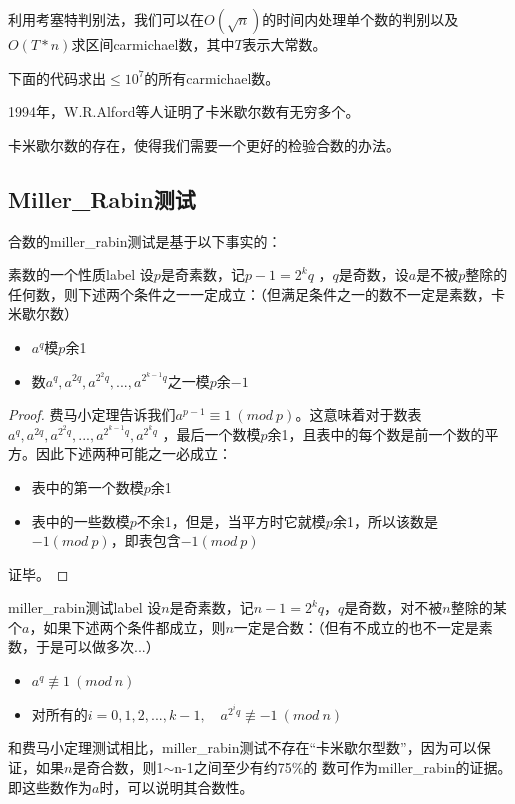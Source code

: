 利用考塞特判别法，我们可以在$O(\sqrt{n})$的时间内处理单个数的判别以及$O(T*n)$求区间carmichael数，其中$T$表示大常数。

下面的代码求出$\le 10^7$的所有carmichael数。


1994年，W.R.Alford等人证明了卡米歇尔数有无穷多个。

卡米歇尔数的存在，使得我们需要一个更好的检验合数的办法。

\subsection{Miller\_Rabin测试}
合数的miller\_rabin测试是基于以下事实的：

\begin{theorem}{素数的一个性质}{label}
设$p$是奇素数，记$p-1=2^kq$ ，$q$是奇数，{\heiti 设$a$是不被$p$整除的任何数}，则下述两个条件之一一定成立：（但满足条件之一的数不一定是素数，卡米歇尔数）
\begin{itemize}
	\item $a^q$模$p$余1
	\item 数$a^q,a^{2q},a^{2^2q},...,a^{2^{k-1}q}$之一模$p$余$-1$
\end{itemize}
\end{theorem}

\begin{proof}
	费马小定理告诉我们$a^{p-1}\equiv 1\ (mod \ p)$。这意味着对于数表$a^q,a^{2q},a^{2^2q},...,a^{2^{k-1}q},a^{2^kq}$ ，最后一个数模$p$余1，且表中的每个数是前一个数的平方。因此下述两种可能之一必成立：
\begin{itemize}
	\item 表中的第一个数模$p$余1
	\item 表中的一些数模$p$不余1，但是，当平方时它就模$p$余1，所以该数是$-1(mod \ p)$，即表包含$-1(mod \ p)$
\end{itemize}
	证毕。
\end{proof}

\begin{theorem}{miller\_rabin测试}{label}
	设$n$是奇素数，记$n-1=2^kq$，$q$是奇数，对不被$n$整除的某个$a$，如果下述{\heiti 两个条件都成立}，则$n$一定是合数：（但有不成立的也不一定是素数，于是可以做多次...）
	\begin{itemize}
		\item $a^q \not\equiv 1 \ (mod \ n)$
		\item 对所有的$i=0,1,2,...,k-1 ,\quad a^{2^iq}\not\equiv -1\ (mod \ n)$
	\end{itemize}
\end{theorem}
和费马小定理测试相比，miller\_rabin测试不存在“卡米歇尔型数”，因为可以保证，如果$n$是奇合数，则1$\sim$n-1之间至少有约75\%的
数可作为miller\_rabin的证据。即这些数作为$a$时，可以说明其合数性。

